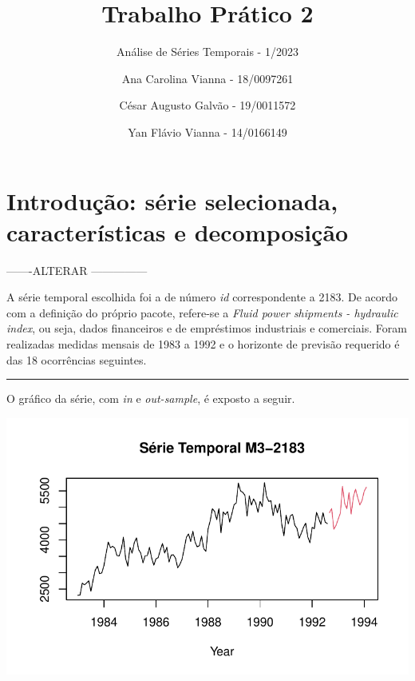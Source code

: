\documentclass[
  letterpaper,
  DIV=11,
  numbers=noendperiod]{scrartcl}
\title{Trabalho Prático 2}
\subtitle{Análise de Séries Temporais - 1/2023}
\author{Ana Carolina Vianna - 18/0097261 \and César Augusto Galvão -
19/0011572 \and Yan Flávio Vianna - 14/0166149}
\date{}
\renewcommand*\contentsname{Table of contents}
\newcommand\contentsname{Table of contents}
\begin{document}
\maketitle
\ifdefined\Shaded\renewenvironment{Shaded}{\begin{tcolorbox}[frame hidden, boxrule=0pt, interior hidden, borderline west={3pt}{0pt}{shadecolor}, enhanced, sharp corners, breakable]}{\end{tcolorbox}}\fi

\renewcommand*\contentsname{Table of contents}
{
\hypersetup{linkcolor=}
\setcounter{tocdepth}{3}
\tableofcontents
}
\newpage{}

\hypertarget{introduuxe7uxe3o-suxe9rie-selecionada-caracteruxedsticas-e-decomposiuxe7uxe3o}{%
\section{Introdução: série selecionada, características e
decomposição}\label{introduuxe7uxe3o-suxe9rie-selecionada-caracteruxedsticas-e-decomposiuxe7uxe3o}}

-------ALTERAR ---------------

A série temporal escolhida foi a de número \emph{id} correspondente a
2183. De acordo com a definição do próprio pacote, refere-se a
\emph{Fluid power shipments - hydraulic index}, ou seja, dados
financeiros e de empréstimos industriais e comerciais. Foram realizadas
medidas mensais de 1983 a 1992 e o horizonte de previsão requerido é das
18 ocorrências seguintes.

\begin{center}\rule{0.5\linewidth}{0.5pt}\end{center}

O gráfico da série, com \emph{in} e \emph{out-sample}, é exposto a
seguir.

\includegraphics{T2_grupo5_files/figure-pdf/plot-serie-total-1.pdf}
\end{document}
